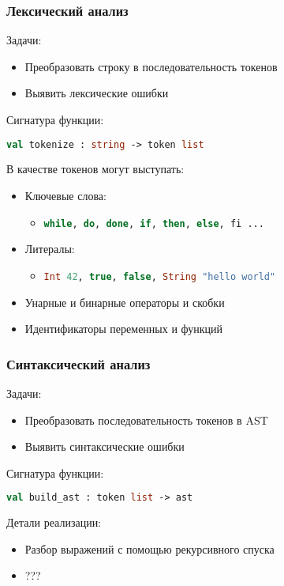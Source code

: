 \documentclass{beamer}
\begin{document}
	\begin{frame}[fragile]
		\frametitle{Лексический анализ}
			Задачи:
			\begin{itemize}
				\item Преобразовать строку в последовательность токенов
				\item Выявить лексические ошибки
			\end{itemize}
			Сигнатура функции:

			\begin{lstlisting}[language=ML] 
			val tokenize : string -> token list
			\end{lstlisting}

			В качестве токенов могут выступать:
			\begin{itemize}
				\item Ключевые слова:
				\begin{itemize}
					\item \lstinline[language=ML]|while, do, done, if, then, else, fi ...|
				\end{itemize}
				\item Литералы:
				\begin{itemize}
					\item \lstinline[language=ML]|Int 42, true, false, String "hello world"|
				\end{itemize}
				\item Унарные и бинарные операторы и скобки
				\item Идентификаторы переменных и функций
			\end{itemize}
	\end{frame}
	
	\begin{frame}[fragile]
		\frametitle{Синтаксический анализ}
		Задачи:
		\begin{itemize}
			\item Преобразовать последовательность токенов в AST
			\item Выявить синтаксические ошибки
		\end{itemize}
		Сигнатура функции:	
		\begin{lstlisting}[language=ML] 
		val build_ast : token list -> ast
		\end{lstlisting}
		Детали реализации:
		\begin{itemize}
			\item Разбор выражений с помощью рекурсивного спуска
			\item ???
		\end{itemize}
		\end{frame}
	
\end{document}
